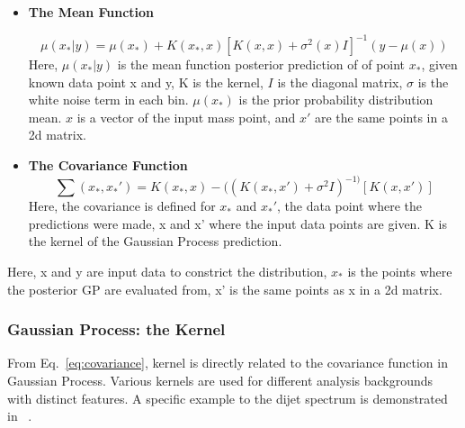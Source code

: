 
    \begin{itemize}

        \item \textbf{The Mean Function}

    \begin{equation}
        \mu(x_{*}|y)  = \mu(x_{*})+ K(x_{*}, x)[K(x, x)+ \sigma^{2}(x)I]^{-1}(y-\mu(x))
    \end{equation}
    Here, $\mu(x_{*}| y) $ is the mean function posterior prediction of of point $x_{*}$, given known data point x and y, K is the kernel, $I$ is the diagonal matrix, $\sigma$ is the white noise term in each bin. $\mu(x_{*})$ is the prior probability distribution mean. $x$ is a vector of the input mass point, and $x'$ are the same points in a 2d matrix.

    \item \textbf{The Covariance Function}
    \begin{equation}
        \sum(x_{*}, x_{*}') = K(x_{*}, x) - ((K(x_{*}, x')+\sigma^{2}I)^{-1)}[K(x, x')]
    \label{eq:covariance}
    \end{equation}  
    Here, the covariance is defined for $x_{*}$ and $x_{*}'$, the data point where the predictions were made, x and x' where the input data points are given. K is the kernel of the Gaussian Process prediction.

    \end{itemize}

    Here, x and y are input data to constrict the distribution, $x_{*}$ is the points where the posterior GP are evaluated from, x' is the same points as x in a 2d matrix.

    \subsubsection{Gaussian Process: the Kernel}
\label{sec:kernel}
From Eq.~\ref{eq:covariance}, kernel is directly related to the covariance function in Gaussian Process. Various kernels are used for different analysis backgrounds with distinct features. A specific example to the dijet spectrum is demonstrated in ~\cite{frate2017modeling}.

